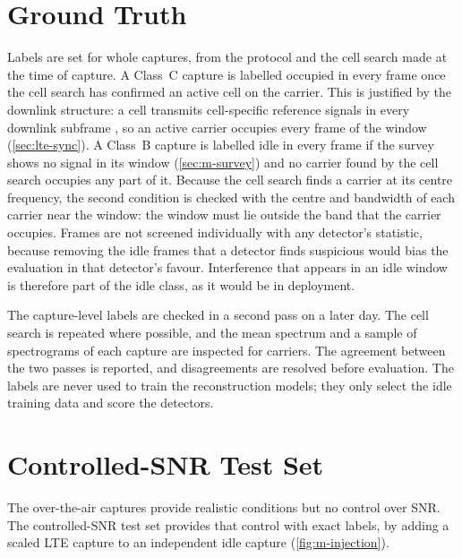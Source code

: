 \section{Ground Truth}
\label{sec:m-labels}

Labels are set for whole captures, from the protocol and the cell search made at the time of capture. A Class~C capture is labelled occupied in every frame once the cell search has confirmed an active cell on the carrier. This is justified by the downlink structure: a cell transmits cell-specific reference signals in every downlink subframe \parencite[clause~6.10.1]{3gpp2026a}, so an active carrier occupies every frame of the window (\cref{sec:lte-sync}). A Class~B capture is labelled idle in every frame if the survey shows no signal in its window (\cref{sec:m-survey}) and no carrier found by the cell search occupies any part of it. Because the cell search finds a carrier at its centre frequency, the second condition is checked with the centre and bandwidth of each carrier near the window: the window must lie outside the band that the carrier occupies. Frames are not screened individually with any detector's statistic, because removing the idle frames that a detector finds suspicious would bias the evaluation in that detector's favour. Interference that appears in an idle window is therefore part of the idle class, as it would be in deployment.

The capture-level labels are checked in a second pass on a later day. The cell search is repeated where possible, and the mean spectrum and a sample of spectrograms of each capture are inspected for carriers. The agreement between the two passes is reported, and disagreements are resolved before evaluation. The labels are never used to train the reconstruction models; they only select the idle training data and score the detectors.

\section{Controlled-SNR Test Set}
\label{sec:m-injection}

The over-the-air captures provide realistic conditions but no control over SNR. The controlled-SNR test set provides that control with exact labels, by adding a scaled LTE capture to an independent idle capture (\cref{fig:m-injection}).

